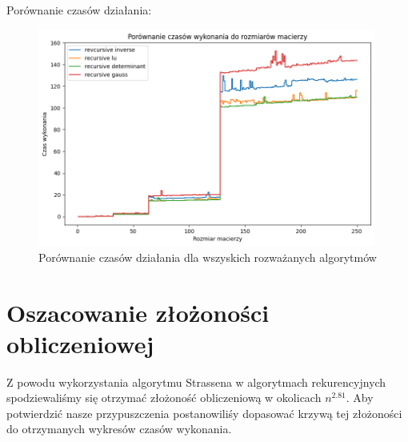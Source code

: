 \documentclass{article}
\begin{document}
\bigbreak

\noindent
Porównanie czasów działania:

\begin{figure}[H]
  \centering
    \includegraphics[width=0.99\textwidth]{time_comparison.png}
  \caption{Porównanie czasów działania dla wszyskich rozważanych algorytmów}
\end{figure}

\section{Oszacowanie złożoności obliczeniowej}

\noindent
Z powodu wykorzystania algorytmu Strassena w algorytmach rekurencyjnych spodziewaliśmy się otrzymać złożoność obliczeniową w okolicach \(n^{2.81}\). Aby potwierdzić nasze przypuszczenia postanowiliśy dopasować krzywą tej złożoności do otrzymanych wykresów czasów wykonania.
\end{document}
